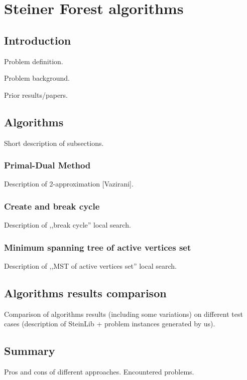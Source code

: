 \chapter{Steiner Forest algorithms}

\section{Introduction}
Problem definition.


Problem background.


Prior results/papers.


\section{Algorithms}
Short description of subsections.

\subsection{Primal-Dual Method}
Description of 2-approximation [Vazirani].

\subsection{Create and break cycle}
Description of ,,break cycle'' local search.

\subsection{Minimum spanning tree of active vertices set}
Description of ,,MST of active vertices set'' local search.

\section{Algorithms results comparison}
Comparison of algorithms results (including some variations) on different test cases (description of SteinLib + problem instances generated by us).

\section{Summary}
Pros and cons of different approaches. Encountered problems.
